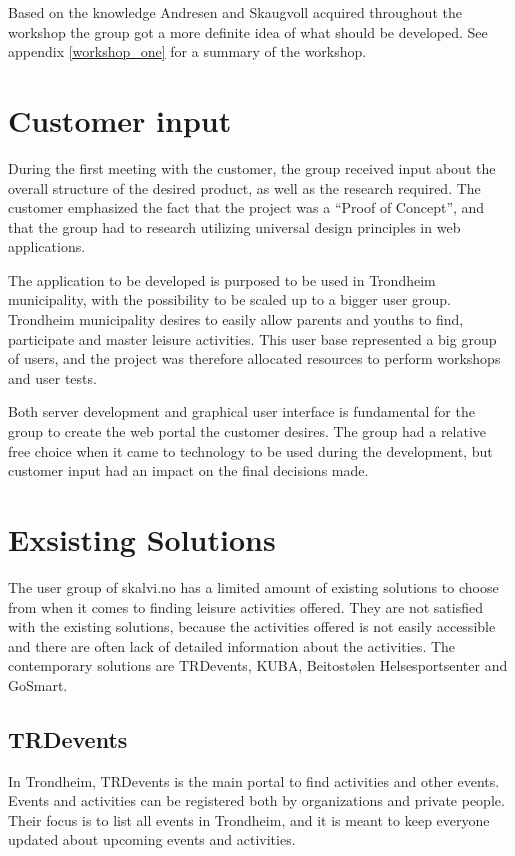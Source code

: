 Based on the knowledge Andresen and Skaugvoll acquired throughout the workshop the group got a more definite idea of what should be developed. See appendix \ref{workshop_one} for a summary of the workshop.


\section{Customer input}
\label{Customer input}
During the first meeting with the customer, the group received input about the overall structure of the desired product, as well as the research required. The customer emphasized the fact that the project was a “Proof of Concept”, and that the group had to research utilizing universal design principles in web applications.

The application to be developed is purposed to be used in Trondheim municipality, with the possibility to be scaled up to a bigger user group. Trondheim municipality desires to easily allow parents and youths to find, participate and master leisure activities. This user base represented a big group of users, and the project was therefore allocated resources to perform workshops and user tests.

Both server development and graphical user interface is fundamental for the group to create the web portal the customer desires. The group had a relative free choice when it came to technology to be used during the development, but customer input had an impact on the final decisions made.

\section{Exsisting Solutions}
\label{alternativeSolutions}
The user group of skalvi.no has a limited amount of existing solutions to choose from when it comes to finding leisure activities offered. They are not satisfied with the existing solutions, because the activities offered is not easily accessible and there are often lack of detailed information about the activities.  
The contemporary solutions are TRDevents, KUBA, Beitostølen Helsesportsenter and GoSmart.

\subsection{TRDevents}
In Trondheim, TRDevents \cite{TRDevents} is the main portal to find activities and other events. Events and activities can be registered both by organizations and private people. Their focus is to list all events in Trondheim, and it is meant to keep everyone updated about upcoming events and activities. 

